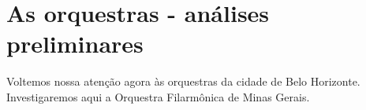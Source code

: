 \documentclass[a4paper, 12pt, openright, oneside, german, french, english, brazil]{abntex2}
\begin{document}

	
	
	
	
	
	
	
	
	
	
	
	\chapter{As orquestras - análises preliminares}
	
	Voltemos nossa atenção agora às orquestras da cidade de Belo Horizonte. Investigaremos aqui a Orquestra Filarmônica de Minas Gerais.
	
\end{document}
